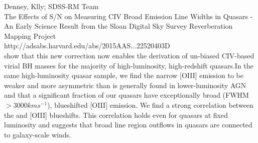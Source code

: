 \documentclass[a4paper,fleqn,usenatbib]{mnras}
\begin{document}



Denney, Klly; SDSS-RM Team \\
The Effects of S/N on Measuring CIV Broad Emission Line Widths in Quasars - An Early Science Result from the Sloan Digital Sky Survey Reverberation Mapping Project\\
http://adsabs.harvard.edu/abs/2015AAS...22520403D\\

\citet{Coatman2017AAS} show that this new correction now enables the derivation of un-biased CIV-based virial BH masses for the majority of high-luminosity, high-redshift quasars.In the same high-luminosity quasar sample, we find the narrow [OIII] emission to be weaker and more asymmetric than is generally found in  lower-luminosity AGN and that a significant fraction of our quasars have exceptionally broad (FWHM $> 3000 km s^{-1}$), blueshifted [OIII] emission. We find a strong correlation between the \civ and [OIII] blueshifts. This correlation holds even for quasars at fixed
luminosity and suggests that broad line region outflows in quasars are
connected to galaxy-scale winds.
\end{document}
